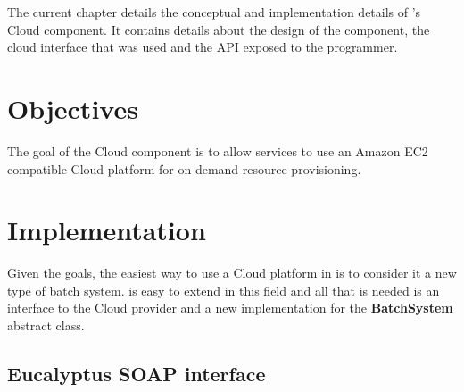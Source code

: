 
The current chapter details the conceptual and implementation details of \diet's Cloud
component. It contains details about the design of the component, the cloud interface
that was used and the API exposed to the \diet programmer.

\section{Objectives}

The goal of the Cloud component is to allow \diet services to use an Amazon EC2 compatible
Cloud platform for on-demand resource provisioning.

\section{Implementation}

Given the goals, the easiest way to use a Cloud platform in \diet is to consider it
a new type of batch system. \diet is easy to extend in this field and all that is needed
is an interface to the Cloud provider and a new implementation for the \textbf{BatchSystem}
abstract class.

\subsection{Eucalyptus SOAP interface}

